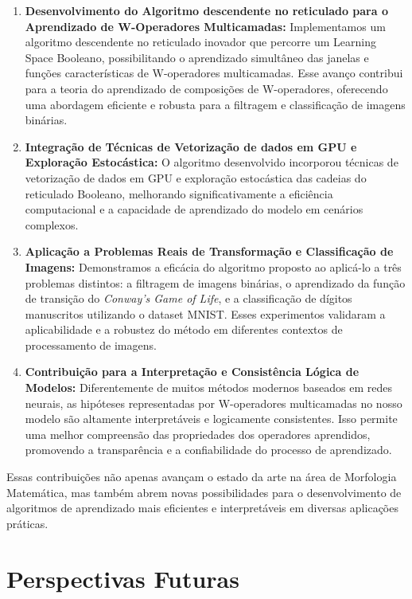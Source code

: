 \begin{enumerate}
    \item \textbf{Desenvolvimento do Algoritmo descendente no reticulado para o Aprendizado de W-Operadores Multicamadas:} Implementamos um algoritmo descendente no reticulado inovador que percorre um Learning Space Booleano, possibilitando o aprendizado simultâneo das janelas e funções características de W-operadores multicamadas. Esse avanço contribui para a teoria do aprendizado de composições de W-operadores, oferecendo uma abordagem eficiente e robusta para a filtragem e classificação de imagens binárias.

    \item \textbf{Integração de Técnicas de Vetorização de dados em GPU e Exploração Estocástica:} O algoritmo desenvolvido incorporou técnicas de vetorização de dados em GPU e exploração estocástica das cadeias do reticulado Booleano, melhorando significativamente a eficiência computacional e a capacidade de aprendizado do modelo em cenários complexos.

    \item \textbf{Aplicação a Problemas Reais de Transformação e Classificação de Imagens:} Demonstramos a eficácia do algoritmo proposto ao aplicá-lo a três problemas distintos: a filtragem de imagens binárias, o aprendizado da função de transição do \textit{Conway's Game of Life}, e a classificação de dígitos manuscritos utilizando o dataset MNIST. Esses experimentos validaram a aplicabilidade e a robustez do método em diferentes contextos de processamento de imagens.

    \item \textbf{Contribuição para a Interpretação e Consistência Lógica de Modelos:} Diferentemente de muitos métodos modernos baseados em redes neurais, as hipóteses representadas por W-operadores multicamadas no nosso modelo são altamente interpretáveis e logicamente consistentes. Isso permite uma melhor compreensão das propriedades dos operadores aprendidos, promovendo a transparência e a confiabilidade do processo de aprendizado.
\end{enumerate}

Essas contribuições não apenas avançam o estado da arte na área de Morfologia Matemática, mas também abrem novas possibilidades para o desenvolvimento de algoritmos de aprendizado mais eficientes e interpretáveis em diversas aplicações práticas.

\section{Perspectivas Futuras}
\label{sec:futuro}

